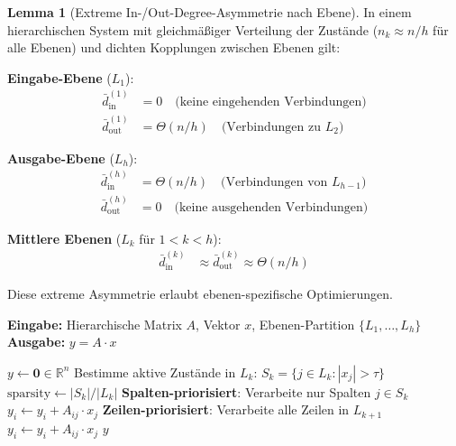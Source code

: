 \documentclass[a4paper,12pt]{report}
\theoremstyle{definition}
\newtheorem{lemma}{Lemma}
\begin{document}
	\begin{lemma}[Extreme In-/Out-Degree-Asymmetrie nach Ebene]
		In einem hierarchischen System mit gleichmäßiger Verteilung der Zustände ($n_k \approx n/h$ für alle Ebenen) und dichten Kopplungen zwischen Ebenen gilt:
		
		\textbf{Eingabe-Ebene} ($L_1$):
		\begin{align}
			\bar{d}_{\text{in}}^{(1)} &= 0 \quad \text{(keine eingehenden Verbindungen)} \\
			\bar{d}_{\text{out}}^{(1)} &= \Theta(n/h) \quad \text{(Verbindungen zu } L_2\text{)}
		\end{align}
		
		\textbf{Ausgabe-Ebene} ($L_h$):
		\begin{align}
			\bar{d}_{\text{in}}^{(h)} &= \Theta(n/h) \quad \text{(Verbindungen von } L_{h-1}\text{)} \\
			\bar{d}_{\text{out}}^{(h)} &= 0 \quad \text{(keine ausgehenden Verbindungen)}
		\end{align}
		
		\textbf{Mittlere Ebenen} ($L_k$ für $1 < k < h$):
		\begin{align}
			\bar{d}_{\text{in}}^{(k)} &\approx \bar{d}_{\text{out}}^{(k)} \approx \Theta(n/h)
		\end{align}
	\end{lemma}
	
	Diese extreme Asymmetrie erlaubt ebenen-spezifische Optimierungen.
	
	\begin{algorithm}[H]
		\caption{Ebenen-adaptive Matrix-Vektor-Multiplikation}
		\label{alg:layer-adaptive}
		\textbf{Eingabe:} Hierarchische Matrix $A$, Vektor $x$, Ebenen-Partition $\{L_1, \ldots, L_h\}$ \\
		\textbf{Ausgabe:} $y = A \cdot x$
		\begin{algorithmic}[1]
			\State $y \gets \mathbf{0} \in \mathbb{R}^n$
			\State Bestimme aktive Zustände in $L_k$: $S_k = \{j \in L_k : |x_j| > \tau\}$
			\State $\text{sparsity} \gets |S_k| / |L_k|$
			\State \textbf{Spalten-priorisiert}: Verarbeite nur Spalten $j \in S_k$
			\State $y_i \gets y_i + A_{ij} \cdot x_j$
			\EndFor
			\EndFor
			\Else
			\State \textbf{Zeilen-priorisiert}: Verarbeite alle Zeilen in $L_{k+1}$
			\State $y_i \gets y_i + A_{ij} \cdot x_j$
			\EndFor
			\EndFor
			\EndIf
			\EndFor
			\State \Return $y$
		\end{algorithmic}
	\end{algorithm}
\end{document}
